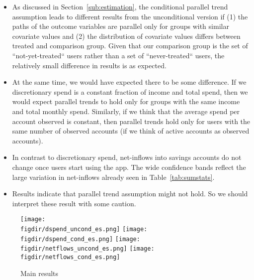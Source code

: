 \begin{itemize}
    \item As discussed in Section~\ref{sub:estimation}, the conditional
        parallel trend assumption leads to different results from the
        unconditional version if (1) the paths of the outcome variables are
        parallel only for groups with similar covariate values and (2) the
        distribution of covariate values differs between treated and comparison
        group. Given that our comparison group is the set of
        ``not-yet-treated`` users rather than a set of ``never-treated`` users,
        the relatively small difference in results is as expected.

    \item At the same time, we would have expected there to be some difference.
        If we discretionary spend is a constant fraction of income and total
        spend, then we would expect parallel trends to hold only for groups
        with the same income and total monthly spend. Similarly, if we think
        that the average spend per account observed is constant, then parallel
        trends hold only for users with the same number of observed accounts
        (if we think of active accounts as observed accounts).

    \item In contrast to discretionary spend, net-inflows into savings accounts
        do not change once users start using the app. The wide confidence
        bands reflect the large variation in net-inflows already seen in
        Table~\ref{tab:sumstats}.

    \item Results indicate that parallel trend assumption might not hold. So we
        should interpret these result with some caution.

\end{itemize}


\begin{figure}[H]
    \centering 
    \caption{Main results}
    \label{fig:main_results}
    \texttt{[image: \\figdir/dspend\_uncond\_es.png]}
    \texttt{[image: \\figdir/dspend\_cond\_es.png]}
    \texttt{[image: \\figdir/netflows\_uncond\_es.png]}
    \texttt{[image: \\figdir/netflows\_cond\_es.png]}
\end{figure}


